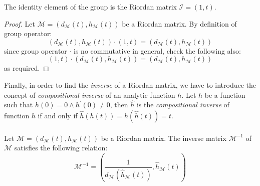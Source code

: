 The  identity element of the group
is the Riordan matrix $\mathcal{I}=(1,t)$.
\begin{proof}
    Let $\mathcal{M}=\left(d_{\mathcal{M}}(t),h_{\mathcal{M}}(t)\right)$ be a Riordan matrix.
    By definition of group operator:
    \begin{displaymath}
        \left(d_{\mathcal{M}}(t),h_{\mathcal{M}}(t)\right)\cdot \left(1,t\right) = 
            \left(d_{\mathcal{M}}(t), h_{\mathcal{M}}(t)\right)
    \end{displaymath}
    since group operator $\cdot$ is no commutative in general, check the following also:
    \begin{displaymath}
        \left(1,t\right) \cdot \left(d_{\mathcal{M}}(t),h_{\mathcal{M}}(t)\right)= 
            \left(d_{\mathcal{M}}(t), h_{\mathcal{M}}(t)\right)
    \end{displaymath}
    as required.
\end{proof}

Finally, in order to find the \emph{inverse} of a Riordan matrix, we have to
introduce the concept of 
\emph{compositional inverse} of an analytic function $h$.
Let $h$ be a function such that $h(0)=0 \wedge h^{\prime}(0)\neq0$, then
$\hat{h}$ is the \emph{compositional inverse} of function $h$ if and only if 
$\hat{h}(h(t))=h(\hat{h}(t))=t$. 
\\\\
Let $\mathcal{M}=\left(d_{\mathcal{M}}(t),h_{\mathcal{M}}(t)\right)$ be a Riordan matrix.
The inverse matrix $\mathcal{M}^{-1}$ of $\mathcal{M}$ satisfies the following relation:
\begin{displaymath}
    \mathcal{M}^{-1}=\left(
        \frac{1}{d_{\mathcal{M}}(\hat{h}_{\mathcal{M}}(t))}, \hat{h}_{\mathcal{M}}(t)
    \right)
\end{displaymath}

